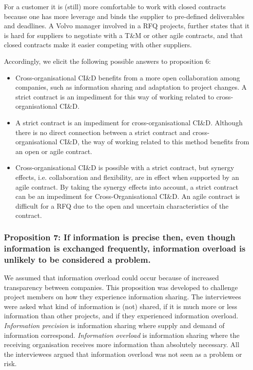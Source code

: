  For a customer it is (still) more comfortable to work with closed contracts because one has more leverage and binds the supplier to pre-defined deliverables and deadlines. A Volvo manager involved in a RFQ projects, further states that it is hard for suppliers to negotiate with a T\&M or other agile contracts, and that closed contracts make it easier competing with other suppliers.

Accordingly, we elicit the following possible answers to proposition 6:

\begin{itemize}
\item Cross-organisational CI\&D benefits from a more open collaboration among companies, such as information sharing and adaptation to project changes. A strict contract is an impediment for this way of working related to cross-organisational CI\&D.
\item A strict contract is an impediment for cross-organisational CI\&D. Although there is no direct connection between a strict contract and cross-organisational CI\&D, the way of working related to this method benefits from an open or agile contract.
\item Cross-organisational CI\&D is possible with a strict contract, but synergy effects, i.e. collaboration and flexibility, are in effect when supported by an agile contract. By taking the synergy effects into account, a strict contract can be an impediment for Cross-Organisational CI\&D. An agile contract is difficult for a RFQ due to the open and uncertain characteristics of the contract.
\end{itemize}

\subsubsection{Proposition 7: If information is precise then, even though information is exchanged frequently, information overload is unlikely to be considered a problem.}

We assumed that information overload could occur because of increased transparency between companies. This proposition was developed to challenge project members on how they experience information sharing. The interviewees were asked what kind of information is (not) shared, if it is much more or less information than other projects, and if they experienced information overload. {\em Information precision} is information sharing where supply and demand of information correspond. {\em Information overload} is information sharing where the receiving organisation receives more information than absolutely necessary. All the interviewees argued that information overload was not seen as a problem or risk.

